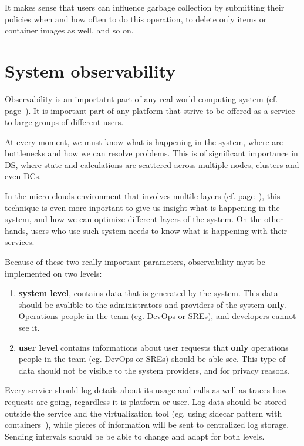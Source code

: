 It makes sense that users can influence garbage collection by submitting their policies when and how often to do this operation, to delete only items or container images as well, and so on.
%
%
\section{System observability}\label{sec:system_observability}
%
Observability is an importatnt part of any real-world computing system (cf. page~\pageref{sec:log_aggregation}). It is important part of any platform that strive to be offered as a service to large groups of different users. 

At every moment, we must know what is happening in the system, where are bottlenecks and how we can resolve problems. This is of significant importance in DS, where state and calculations are scattered across multiple nodes, clusters and even DCs.

In the micro-clouds environment that involves multile layers (cf. page~\pageref{lab:three-tier}), this technique is even more inportant to give us insight what is happening in the system, and how we can optimize different layers of the system. On the other hands, users who use such system needs to know what is happening with their services.

Because of these two really important parameters, observability myst be implemented on two levels:

\begin{enumerate}[start=1,label={(\bfseries \arabic*)}]
	\item \textbf{system level}, contains data that is generated by the system. This data should be avalible to the administrators and providers of the system \textbf{only}. Operations people in the team (eg. DevOps or SREs), and developers cannot see it.
	\item \textbf{user level} contains informations about user requests that \textbf{only} operations people in the team (eg. DevOps or SREs) should be able see. This type of data should not be visible to the system providers, and for privacy reasons.
\end{enumerate}

\noindent
Every service should log details about its usage and calls as well as traces how requests are going, regardless it is platform or user. Log data should be stored outside the service and the virtualization tool (eg. using sidecar pattern with containers~\cite{BurnsO16}), while pieces of information will be sent to centralized log storage. Sending intervals should be be able to change and adapt for both levels.

